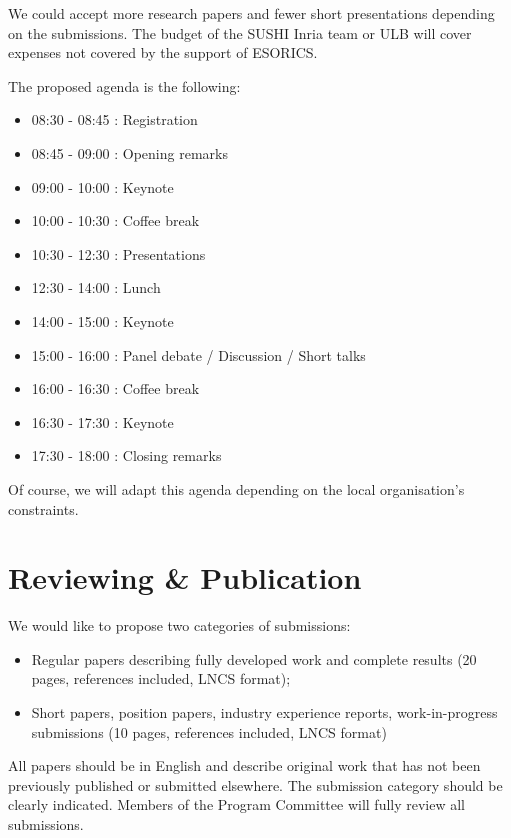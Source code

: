 \documentclass[a4paper,11pt]{article}
\begin{document}
We could accept more research papers and
fewer short presentations depending on the submissions. The budget of the SUSHI Inria team or ULB will cover expenses not covered by the support of ESORICS.

The proposed agenda is the following:
%
\begin{itemize}
    \item 08:30 - 08:45 : Registration
    \item 08:45 - 09:00 : Opening remarks
    \item 09:00 - 10:00 : Keynote
    \item 10:00 - 10:30 : Coffee break
    \item 10:30 - 12:30 : Presentations
    \item 12:30 - 14:00 : Lunch
    \item 14:00 - 15:00 : Keynote
    \item 15:00 - 16:00 : Panel debate / Discussion / Short talks
    \item 16:00 - 16:30 : Coffee break
    \item 16:30 - 17:30 : Keynote
    \item 17:30 - 18:00 : Closing remarks
\end{itemize}
%
Of course, we will adapt this agenda depending on the local organisation's constraints.


\section{Reviewing \& Publication}
%
We would like to propose two categories of submissions:
%
\begin{itemize}
%
    \item Regular papers describing fully developed work and complete
results (20 pages, references included, LNCS format);
%
    \item Short papers, position papers, industry experience reports,
work-in-progress submissions (10 pages, references included, LNCS format)
%
\end{itemize}

All papers should be in English and describe original work that has not
been previously published or submitted elsewhere. The submission category
should be clearly indicated. Members of the Program Committee will fully review all submissions.
\end{document}
